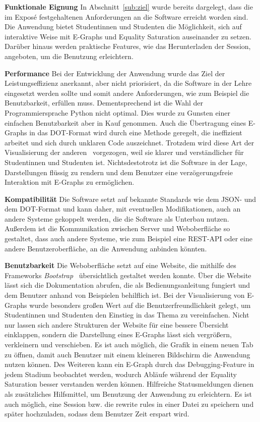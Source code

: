 \noindent\textbf{Funktionale Eignung} In Abschnitt~\ref{sub:ziel} wurde bereits dargelegt, dass die im Exposé festgehaltenen Anforderungen an die Software erreicht worden sind.
Die Anwendung bietet Studentinnen und Studenten die Möglichkeit, sich auf interaktive Weise mit E-Graphs und Equality Saturation auseinander zu setzen.
Darüber hinaus werden praktische Features, wie das Herunterladen der Session, angeboten, um die Benutzung erleichtern.

\noindent\textbf{Performance} Bei der Entwicklung der Anwendung wurde das Ziel der Leistungseffizienz anerkannt, aber nicht priorisiert, da die Software in der Lehre eingesetzt werden sollte
und somit andere Anforderungen, wie zum Beispiel die Benutzbarkeit, erfüllen muss. Dementsprechend ist die Wahl der Programmiersprache Python nicht optimal. Dies wurde zu Gunsten einer einfachen Benutzbarkeit
aber in Kauf genommen.
Auch die Übertragung eines E-Graphs in das DOT-Format wird durch eine Methode geregelt, die ineffizient arbeitet und sich durch unklaren Code auszeichnet. Trotzdem wird diese Art der Visualisierung
der anderen~\cite{devito} vorgezogen, weil sie klarer und verständlicher für Studentinnen und Studenten ist.
Nichtsdestotrotz ist die Software in der Lage, Darstellungen flüssig zu rendern und dem Benutzer eine verzögerungsfreie Interaktion mit E-Graphs zu ermöglichen.

\noindent\textbf{Kompatibilität} Die Software setzt auf bekannte Standards wie dem JSON- und dem DOT-Format und kann daher, mit eventuellen Modifikationen, auch an andere Systeme gekoppelt werden, die 
die Software als Unterbau nutzen.
Außerdem ist die Kommunikation zwischen Server und Weboberfläche so gestaltet, dass auch andere Systeme, wie zum Beispiel eine REST-API oder eine andere Benutzeroberfläche, an die Anwendung anbinden könnten.

\noindent\textbf{Benutzbarkeit} Die Weboberfläche setzt auf eine Website, die mithilfe des Frameworks \textit{Bootstrap}~\cite{bootstrap} übersichtlich gestaltet werden konnte.
Über die Website lässt sich die Dokumentation abrufen, die als Bedienungsanleitung fungiert und dem Benutzer anhand von Beispielen behilflich ist.
Bei der Visualisierung von E-Graphs wurde besonders großen Wert auf die Benutzerfreundlichkeit gelegt, um Studentinnen und Studenten den Einstieg in das Thema zu vereinfachen.
Nicht nur lassen sich andere Strukturen der Website für eine bessere Übersicht 
einklappen, sondern die Darstellung eines E-Graphs lässt sich vergrößern, verkleinern und verschieben. Es ist auch möglich, die Grafik in einem neuen Tab zu öffnen, damit auch Benutzer
mit einem kleineren Bildschirm die Anwendung nutzen können.
Des Weiteren kann ein E-Graph durch das Debugging-Feature in jedem Stadium beobachtet werden, wodurch Abläufe während der Equality Saturation besser verstanden werden können.
Hilfreiche Statusmeldungen dienen als zusätzliches Hilfsmittel, um Benutzung der Anwendung zu erleichtern.
Es ist auch möglich, eine Session bzw. die rewrite rules in einer Datei zu speichern und später hochzuladen, sodass dem Benutzer Zeit erspart wird.
